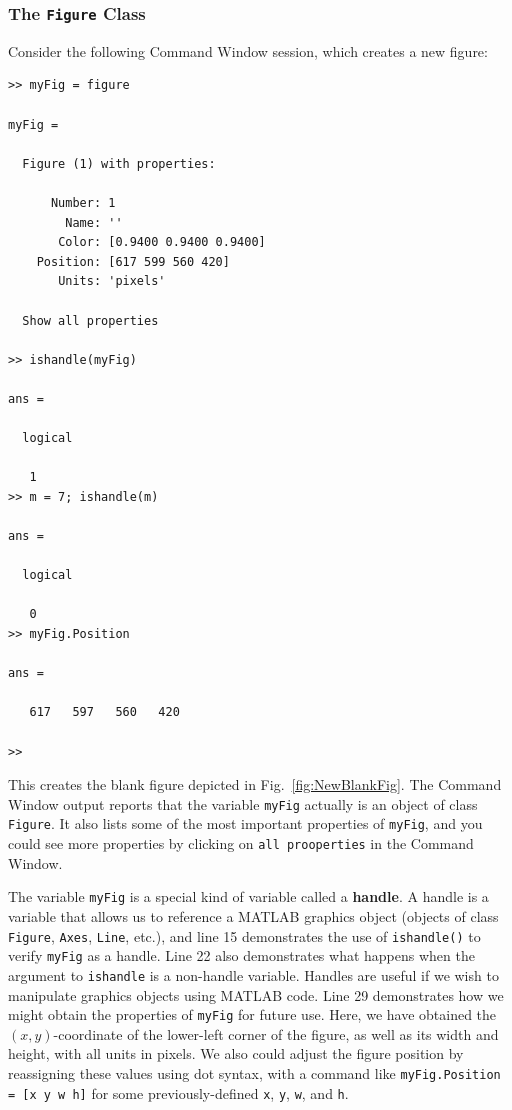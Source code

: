 \subsubsection{The \texttt{Figure} Class}

Consider the following Command Window session, which creates a new figure:
\begin{lstlisting}[style=Matlab-editor, caption={A new figure is created in the MATLAB Command Window.}]
>> myFig = figure

myFig = 

  Figure (1) with properties:

      Number: 1
        Name: ''
       Color: [0.9400 0.9400 0.9400]
    Position: [617 599 560 420]
       Units: 'pixels'

  Show all properties
  
>> ishandle(myFig)

ans =

  logical

   1
>> m = 7; ishandle(m)

ans =

  logical

   0
>> myFig.Position

ans =

   617   597   560   420

>>
\end{lstlisting}
This creates the blank figure depicted in Fig.\ \ref{fig:NewBlankFig}. The Command Window output reports that the variable \texttt{myFig} actually is an object of class \texttt{Figure}. It also lists some of the most important properties of \texttt{myFig}, and you could see more properties by clicking on \texttt{all prooperties} in the Command Window.

The variable \texttt{myFig} is a special kind of variable called a \textbf{handle}. A handle is a variable that allows us to reference a MATLAB graphics object (objects of class \texttt{Figure}, \texttt{Axes}, \texttt{Line}, etc.), and line 15 demonstrates the use of \texttt{ishandle()} to verify \texttt{myFig} as a handle. Line 22 also demonstrates what happens when the argument to \texttt{ishandle} is a non-handle variable. Handles are useful if we wish to manipulate graphics objects using MATLAB code.  Line 29 demonstrates how we might obtain the properties of \texttt{myFig} for future use. Here, we have obtained the \((x,y)\)-coordinate of the lower-left corner of the figure, as well as its width and height, with all units in pixels. We also could adjust the figure position by reassigning these values using dot syntax, with a command like  \texttt{myFig.Position = [x y w h]} for some previously-defined \texttt{x}, \texttt{y}, \texttt{w}, and \texttt{h}. 


